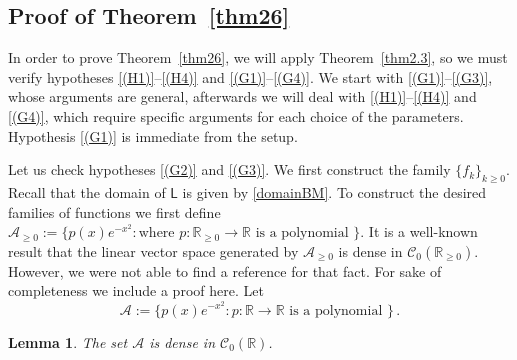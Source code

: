 \documentclass[12pt,a4paper]{article}
\theoremstyle{plain}
\newtheorem{lemma}[theorem]{Lemma}
\theoremstyle{remark}
\newcommand{\msf}[1]{{\mathsf #1}}
\newcommand{\mc}[1]{{\mathcal #1}}
\newcommand{\bb}[1]{{\mathbb #1}}
\begin{document}
	
	\subsection{Proof of Theorem~\ref{thm26}}
	\label{sec:3.2}
	
	In order to prove Theorem~\ref{thm26}, we will apply Theorem~\ref{thm2.3}, so we must verify  hypotheses \ref{(H1)}--\ref{(H4)} and \ref{(G1)}--\ref{(G4)}.
	We start with \ref{(G1)}--\ref{(G3)}, whose arguments are general, afterwards we will deal with \ref{(H1)}--\ref{(H4)} and \ref{(G4)}, which require specific arguments for each choice of the parameters. 
	Hypothesis \ref{(G1)} is immediate from the setup.
	
	
	Let us check hypotheses \ref{(G2)} and  \ref{(G3)}. We first construct the family $\{f_k\}_{k\geq 0}$. Recall that the domain of $\msf{L}$ is given by \eqref{domainBM}. To construct the desired families of functions we first define $\mc{A}_{\geq 0} := \big\{p(x)e^{-x^2}:  \text{where }p:\bb R_{\geq 0}\to \bb R  \text{ is a polynomial }\big\}$. 
	It is a well-known result  that the linear vector space generated by $\mc{A}_{\geq 0}$ is dense in $\mc {C}_0(\bb R_{\geq 0})$. However, we were not able to find a reference for that fact. For sake of completeness we include a proof here. Let
	\begin{equation*}
		\mc{A} := \Big\{p(x)e^{-x^2}:  p:\bb R\to \bb R  \text{ is a polynomial }\Big\}\,.
	\end{equation*}
	\begin{lemma}\label{lemma1} The set
		$\mc{A}$ is dense in $\mc{C}_0(\bb R)$.
	\end{lemma}
\end{document}
